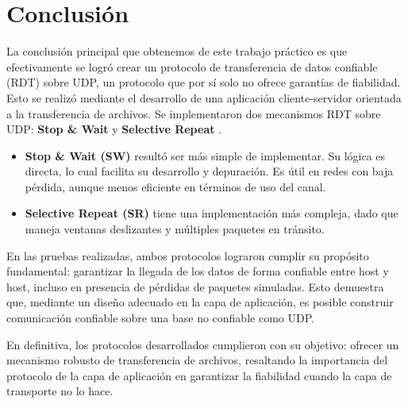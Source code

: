 \documentclass[a4paper,10pt]{article}
\begin{document}
\section{Conclusión}

La conclusión principal que obtenemos de este trabajo práctico es que efectivamente se logró crear un protocolo de transferencia de datos confiable (RDT) sobre UDP, un protocolo que por sí solo no ofrece garantías de fiabilidad. Esto se realizó mediante el desarrollo de una aplicación cliente-servidor orientada a la transferencia de archivos. Se implementaron dos mecanismos RDT sobre UDP: \textbf{Stop \& Wait} y \textbf{Selective Repeat }.

\begin{itemize}
    \item \textbf{Stop \& Wait (SW)} resultó ser más simple de implementar. Su lógica es directa, lo cual facilita su desarrollo y depuración. Es útil en redes con baja pérdida, aunque menos eficiente en términos de uso del canal.
    
    \item \textbf{Selective Repeat (SR)} tiene una implementación más compleja, dado que maneja ventanas deslizantes y múltiples paquetes en tránsito.

\end{itemize}

En las pruebas realizadas, ambos protocolos lograron cumplir su propósito fundamental: garantizar la llegada de los datos de forma confiable entre host y host, incluso en presencia de pérdidas de paquetes simuladas. Esto demuestra que, mediante un diseño adecuado en la capa de aplicación, es posible construir comunicación confiable sobre una base no confiable como UDP.

En definitiva, los protocolos desarrollados cumplieron con su objetivo: ofrecer un mecanismo robusto de transferencia de archivos, resaltando la importancia del protocolo de la capa de aplicación en garantizar la fiabilidad cuando la capa de transporte no lo hace.
\end{document}
